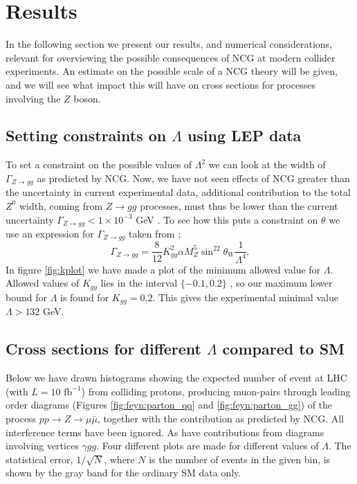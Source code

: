 \section{Results}
In the following section we present our results, and numerical considerations, relevant for overviewing the possible consequences of NCG at modern collider experiments. An estimate on the possible scale of a NCG theory will be given, and we will see what impact this will have on cross sections for processes involving the $Z$ boson.

\subsection{Setting constraints on $\Lambda$ using LEP data}
To set a constraint on the possible values of $\Lambda^2$ we can look at the width of $\Gamma_{Z \rightarrow gg}$ as predicted by NCG. Now, we have not seen effects of NCG greater than the uncertainty in current experimental data, additional contribution to the total $Z^0$ width, coming from $Z \rightarrow gg$ processes, must thus be lower than the current uncertainty $\Gamma_{Z \rightarrow gg} < 1 \times 10^{-3}$ GeV \cite{behr2003dnc}. To see how this puts a constraint on $\theta$ we use an expression for $\Gamma_{Z \rightarrow gg}$ taken from \cite{behr2003dnc};
\begin{equation} \label{eq:zggwidth}
	\Gamma_{Z \rightarrow gg} = \frac{8}{12} K_{gg}^2 \alpha M_Z^5 \sin^22\theta_W \frac{1}{\Lambda^4}.
\end{equation}
In figure \ref{fig:kplot} we have made a plot of the minimum allowed value for $\Lambda$. Allowed values of $K_{gg}$ lies in the interval $\{-0.1,0.2\}$ \cite{behr2003dnc}, so our maximum lower bound for $\Lambda$ is found for $K_{gg}=0.2$. This gives the experimental minimal value $\Lambda >132$ GeV.

\subsection{Cross sections for different $\Lambda$ compared to SM}
Below we have drawn histograms showing the expected number of event at LHC (with $L=10 \textrm{ fb}^{-1}$) from colliding protons, producing muon-pairs through leading order diagrams (Figures \ref{fig:feyn:parton_qq} and \ref{fig:feyn:parton_gg}) of the process $pp \rightarrow Z \rightarrow \mu \bar \mu$, together with the contribution as predicted by NCG. All interference terms have been ignored. As have contributions from diagrams involving vertices $\gamma gg$. Four different plots are made for different values of $\Lambda$. The statistical error, $1/\sqrt{N}$, where $N$ is the number of events in the given bin, is shown by the gray band for the ordinary SM data only.


